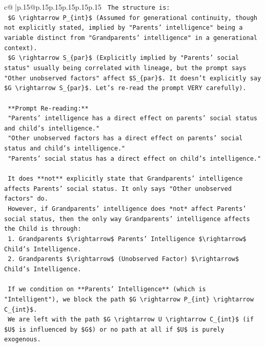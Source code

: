 \documentclass{article}
\begin{document}
{\begin{supertabular}{c@{$\;$}|p{.15\linewidth}@{}p{.15\linewidth}p{.15\linewidth}p{.15\linewidth}p{.15\linewidth}p{.15\linewidth}}
{{{\texttt{    The structure is:} \\
\texttt{    \$G \textbackslash{}rightarrow P\_\{int\}\$ (Assumed for generational continuity, though not explicitly stated, implied by "Parents' intelligence" being a variable distinct from "Grandparents' intelligence" in a generational context).} \\
\texttt{    \$G \textbackslash{}rightarrow S\_\{par\}\$ (Explicitly implied by "Parents' social status" usually being correlated with lineage, but the prompt says "Other unobserved factors" affect \$S\_\{par\}\$. It doesn't explicitly say \$G \textbackslash{}rightarrow S\_\{par\}\$. Let's re{-}read the prompt VERY carefully).} \\
\\ 
\texttt{    **Prompt Re{-}reading:**} \\
\texttt{    "Parents' intelligence has a direct effect on parents' social status and child's intelligence."} \\
\texttt{    "Other unobserved factors has a direct effect on parents' social status and child's intelligence."} \\
\texttt{    "Parents' social status has a direct effect on child's intelligence."} \\
\\ 
\texttt{    It does **not** explicitly state that Grandparents' intelligence affects Parents' social status. It only says "Other unobserved factors" do.} \\
\texttt{    However, if Grandparents' intelligence does *not* affect Parents' social status, then the only way Grandparents' intelligence affects the Child is through:} \\
\texttt{    1.  Grandparents \$\textbackslash{}rightarrow\$ Parents' Intelligence \$\textbackslash{}rightarrow\$ Child's Intelligence.} \\
\texttt{    2.  Grandparents \$\textbackslash{}rightarrow\$ (Unobserved Factor) \$\textbackslash{}rightarrow\$ Child's Intelligence.} \\
\\ 
\texttt{    If we condition on **Parents' Intelligence** (which is "Intelligent"), we block the path \$G \textbackslash{}rightarrow P\_\{int\} \textbackslash{}rightarrow C\_\{int\}\$.} \\
\texttt{    We are left with the path \$G \textbackslash{}rightarrow U \textbackslash{}rightarrow C\_\{int\}\$ (if \$U\$ is influenced by \$G\$) or no path at all if \$U\$ is purely exogenous.} \\
}}}
\end{supertabular}}
\end{document}
